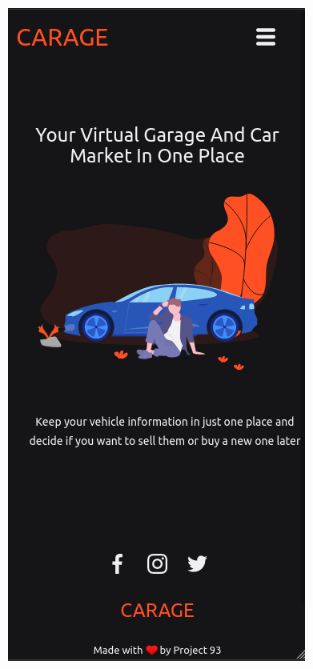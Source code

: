 \documentclass[a4paper]{report}
\begin{document}
\begin{figure}[H]
\centering
\begin{minipage}{.5\textwidth}
  \centering
    \includegraphics[width=0.7\textwidth]{images/homepage_mobile.png}
\end{minipage}%
\begin{minipage}{.5\textwidth}
  \centering

\end{minipage}
\end{figure}
\end{document}
